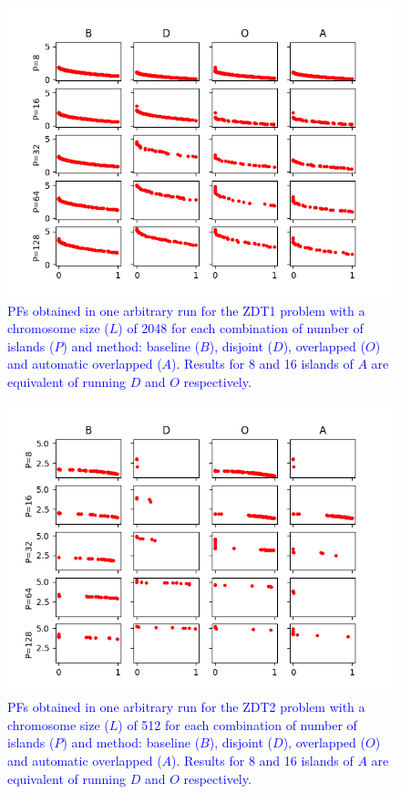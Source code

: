 \documentclass[preprint]{elsarticle}
\begin{document}
\begin{figure}
\centering
\includegraphics[width=12cm]{plot_zdt1_2048.png}
\caption{\textcolor{blue}{PFs obtained in one arbitrary run for the ZDT1 problem with a chromosome size ($L$) of 2048 for each combination of number of islands ($P$) and method: baseline ($B$), disjoint ($D$), overlapped ($O$) and automatic overlapped ($A$). Results for 8 and 16 islands of $A$ are equivalent of running $D$ and $O$ respectively. }}
\label{fig:plot_zdt1_2048}
\end{figure}






\begin{figure}
\centering
\includegraphics[width=12cm]{plot_zdt2_512.png}
\caption{\textcolor{blue}{PFs obtained in one arbitrary run for the ZDT2 problem with a chromosome size ($L$) of 512 for each combination of number of islands ($P$) and method: baseline ($B$), disjoint ($D$), overlapped ($O$) and automatic overlapped ($A$). Results for 8 and 16 islands of $A$ are equivalent of running $D$ and $O$ respectively. }}
\label{fig:plot_zdt2_512}
\end{figure}
\end{document}
